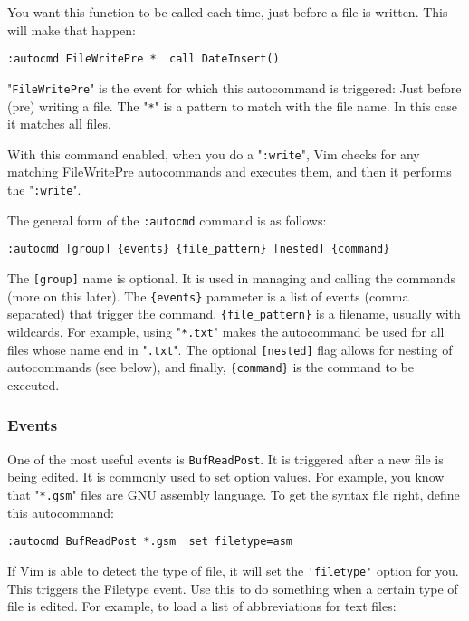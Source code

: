 You want this function to be called each time, just before a file is written.
This will make that happen:

\begin{Verbatim}[samepage=true]
 :autocmd FileWritePre *  call DateInsert()
\end{Verbatim}

"\verb!FileWritePre!" is the event for which this autocommand is triggered: Just before (pre) writing a file.
The "\verb!*!" is a pattern to match with the file name.
In this case it matches all files.

With this command enabled, when you do a "\verb!:write!", Vim checks for any matching FileWritePre autocommands and executes them, and then it performs the "\verb!:write!".

The general form of the \verb!:autocmd! command is as follows:

\begin{Verbatim}[samepage=true]
 :autocmd [group] {events} {file_pattern} [nested] {command}
\end{Verbatim}

The \verb![group]! name is optional.
It is used in managing and calling the commands (more on this later).
The \verb!{events}! parameter is a list of events (comma separated) that trigger the command.
\verb!{file_pattern}! is a filename, usually with wildcards.
For example, using "\verb!*.txt!" makes the autocommand be used for all files whose name end in "\verb!.txt!".
The optional \verb![nested]! flag allows for nesting of autocommands (see below), and finally, \verb!{command}! is the command to be executed.

\subsubsection{Events}
One of the most useful events is \verb!BufReadPost!.
It is triggered after a new file is being edited.
It is commonly used to set option values.
For example, you know that "\verb!*.gsm!" files are GNU assembly language.
To get the syntax file right, define this autocommand:

\begin{Verbatim}[samepage=true]
 :autocmd BufReadPost *.gsm  set filetype=asm
\end{Verbatim}

If Vim is able to detect the type of file, it will set the \verb!'filetype'! option for you.
This triggers the Filetype event.
Use this to do something when a certain type of file is edited.
For example, to load a list of abbreviations for text files:


